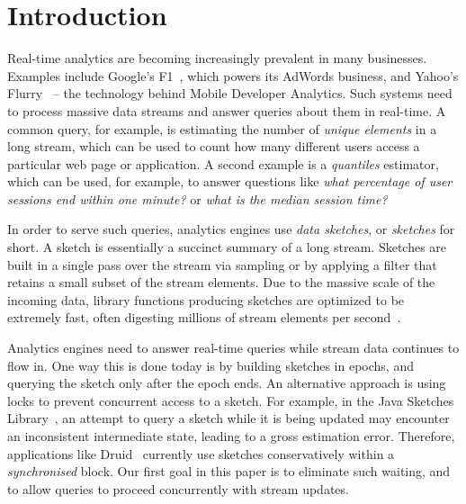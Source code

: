 
\section{Introduction}


Real-time analytics are becoming increasingly prevalent in many businesses. 
Examples include Google's F1~\cite{shute2013f1}, which powers its AdWords
business, and Yahoo's Flurry~\cite{flurry} --
the technology behind Mobile Developer Analytics.
Such systems need to process massive data streams and answer queries about them in real-time.
A common query, for example, is estimating the number of \emph{unique elements} in a long stream, which 
can be used to count how many different users access a particular web page or application. 
A second example is a \emph{quantiles} estimator, which can be used, for example, to  answer questions like 
\emph{what percentage of user sessions end within one minute?} or \emph{what is the median session time?}

In order to serve such queries, analytics engines use 
\emph{data sketches}, or \emph{sketches} for short. A sketch is essentially 
a succinct summary of a long stream. 
Sketches are built in a single pass over the stream via sampling or by applying a filter 
that retains a small subset  of the stream elements. 
Due to the massive scale of the incoming data, library functions producing sketches
are optimized to be extremely fast, often digesting millions of stream elements per second~\cite{sketchesLibrary}. 


 Analytics engines need to answer real-time queries while  stream data continues to flow in.
 One way this is done 
today is by building sketches in epochs, and querying the sketch only after
 the epoch ends. An alternative approach is using locks to prevent concurrent access to a sketch.
 For example, in the Java Sketches Library~\cite{sketchesLibrary},  an 
attempt to query a sketch  while it is being updated may encounter an inconsistent
intermediate state, leading to a gross estimation error. Therefore, applications like Druid~\cite{Druid}
currently use sketches conservatively within a \emph{synchronised} block.
Our first goal in this paper is to eliminate such waiting, and to allow queries to proceed 
concurrently with stream updates. 


